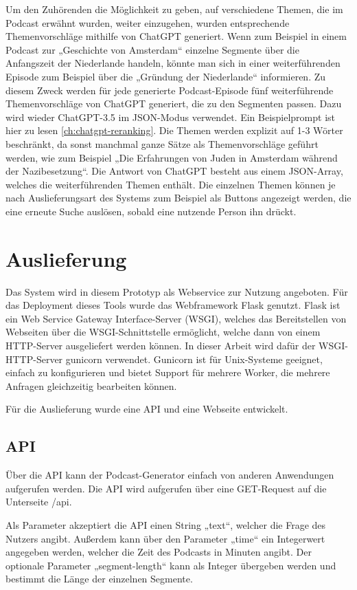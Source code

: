 Um den Zuhörenden die Möglichkeit zu geben, auf verschiedene Themen, die im Podcast erwähnt wurden, weiter einzugehen, wurden entsprechende Themenvorschläge mithilfe von ChatGPT generiert.
Wenn zum Beispiel in einem Podcast zur „Geschichte von Amsterdam“ einzelne Segmente über die Anfangszeit der Niederlande handeln, könnte man sich in einer weiterführenden Episode zum Beispiel über die „Gründung der Niederlande“ informieren.
Zu diesem Zweck werden für jede generierte Podcast-Episode fünf weiterführende Themenvorschläge von ChatGPT generiert, die zu den Segmenten passen.
Dazu wird wieder ChatGPT-3.5 im JSON-Modus verwendet.
Ein Beispielprompt ist hier zu lesen \autoref{ch:chatgpt-reranking}.
Die Themen werden explizit auf 1-3 Wörter beschränkt, da sonst manchmal ganze Sätze als Themenvorschläge geführt werden, wie zum Beispiel „Die Erfahrungen von Juden in Amsterdam während der Nazibesetzung“.
Die Antwort von ChatGPT besteht aus einem JSON-Array, welches die weiterführenden Themen enthält.
Die einzelnen Themen können je nach Auslieferungsart des Systems zum Beispiel als Buttons angezeigt werden, die eine erneute Suche auslösen, sobald eine nutzende Person ihn drückt.

\section{Auslieferung}

Das System wird in diesem Prototyp als Webservice zur Nutzung angeboten.
Für das Deployment dieses Tools wurde das Webframework Flask genutzt.
Flask ist ein Web Service Gateway Interface-Server (WSGI), welches das Bereitstellen von Webseiten über die WSGI-Schnittstelle ermöglicht, welche dann von einem HTTP-Server ausgeliefert werden können.
In dieser Arbeit wird dafür der WSGI-HTTP-Server gunicorn verwendet.
Gunicorn ist für Unix-Systeme geeignet, einfach zu konfigurieren und bietet Support für mehrere Worker, die mehrere Anfragen gleichzeitig bearbeiten können.

Für die Auslieferung wurde eine API und eine Webseite entwickelt.

\subsection{API}

Über die API kann der Podcast-Generator einfach von anderen Anwendungen aufgerufen werden.
Die API wird aufgerufen über eine GET-Request auf die Unterseite /api.

Als Parameter akzeptiert die API einen String „text“, welcher die Frage des Nutzers angibt.
Außerdem kann über den Parameter „time“ ein Integerwert angegeben werden, welcher die Zeit des Podcasts in Minuten angibt.
Der optionale Parameter „segment-length“ kann als Integer übergeben werden und bestimmt die Länge der einzelnen Segmente.

